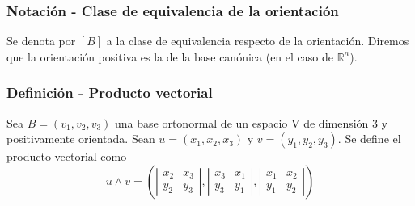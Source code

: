 \documentclass[12pt, a4paper, ones, notitlepage, openany,titlepage]{article}
\begin{document}
\subsubsection{Notación - Clase de equivalencia de la orientación}
Se denota por $[B]$ a la clase de equivalencia respecto de la orientación. Diremos que la orientación positiva es la de la base canónica (en el caso de $\mathbb{R}^n$).

\subsubsection{Definición - Producto vectorial}
Sea $B = (v_1,v_2,v_3)$ una base ortonormal de un espacio V de dimensión $3$ y positivamente orientada. Sean $u = (x_1,x_2,x_3)$ y $v = (y_1,y_2,y_3)$. Se define el producto vectorial como
$$
u \wedge v = \left(\left|
\begin{matrix}
	x_2 & x_3 \\
	y_2 & y_3
\end{matrix}
\right| , \left|
\begin{matrix}
	x_3 & x_1 \\
	y_3 & y_1
\end{matrix}
\right| , \left|
\begin{matrix}
	x_1 & x_2 \\
	y_1 & y_2
\end{matrix}
\right|
\right)
$$
\end{document}
